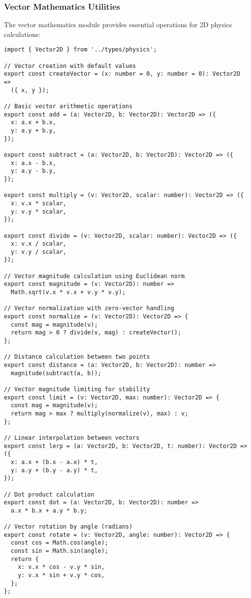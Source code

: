 \documentclass[12pt,journal,onecolumn]{IEEEtran}
\begin{document}
\subsubsection{Vector Mathematics Utilities}

The vector mathematics module provides essential operations for 2D physics calculations:

\begin{verbatim}
import { Vector2D } from '../types/physics';

// Vector creation with default values
export const createVector = (x: number = 0, y: number = 0): Vector2D => 
  ({ x, y });

// Basic vector arithmetic operations
export const add = (a: Vector2D, b: Vector2D): Vector2D => ({
  x: a.x + b.x,
  y: a.y + b.y,
});

export const subtract = (a: Vector2D, b: Vector2D): Vector2D => ({
  x: a.x - b.x,
  y: a.y - b.y,
});

export const multiply = (v: Vector2D, scalar: number): Vector2D => ({
  x: v.x * scalar,
  y: v.y * scalar,
});

export const divide = (v: Vector2D, scalar: number): Vector2D => ({
  x: v.x / scalar,
  y: v.y / scalar,
});

// Vector magnitude calculation using Euclidean norm
export const magnitude = (v: Vector2D): number => 
  Math.sqrt(v.x * v.x + v.y * v.y);

// Vector normalization with zero-vector handling
export const normalize = (v: Vector2D): Vector2D => {
  const mag = magnitude(v);
  return mag > 0 ? divide(v, mag) : createVector();
};

// Distance calculation between two points
export const distance = (a: Vector2D, b: Vector2D): number => 
  magnitude(subtract(a, b));

// Vector magnitude limiting for stability
export const limit = (v: Vector2D, max: number): Vector2D => {
  const mag = magnitude(v);
  return mag > max ? multiply(normalize(v), max) : v;
};

// Linear interpolation between vectors
export const lerp = (a: Vector2D, b: Vector2D, t: number): Vector2D => ({
  x: a.x + (b.x - a.x) * t,
  y: a.y + (b.y - a.y) * t,
});

// Dot product calculation
export const dot = (a: Vector2D, b: Vector2D): number => 
  a.x * b.x + a.y * b.y;

// Vector rotation by angle (radians)
export const rotate = (v: Vector2D, angle: number): Vector2D => {
  const cos = Math.cos(angle);
  const sin = Math.sin(angle);
  return {
    x: v.x * cos - v.y * sin,
    y: v.x * sin + v.y * cos,
  };
};
\end{verbatim}
\end{document}
